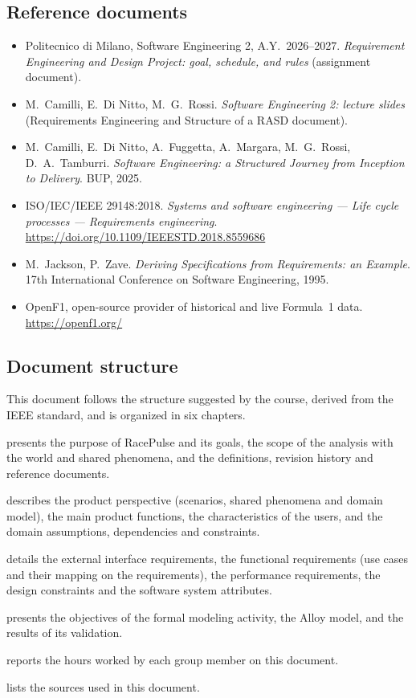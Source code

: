 \documentclass[11pt,a4paper]{article}
\newcommand{\RP}{RacePulse}
\begin{document}
\subsection{Reference documents}
\begin{itemize}[leftmargin=*,itemsep=3pt]
\item Politecnico di Milano, Software Engineering 2, A.Y.\ 2026--2027. \emph{Requirement Engineering and Design Project: goal, schedule, and rules} (assignment document).
\item M.\ Camilli, E.\ Di Nitto, M.\ G.\ Rossi. \emph{Software Engineering 2: lecture slides} (Requirements Engineering and Structure of a RASD document).
\item M.\ Camilli, E.\ Di Nitto, A.\ Fuggetta, A.\ Margara, M.\ G.\ Rossi, D.\ A.\ Tamburri. \emph{Software Engineering: a Structured Journey from Inception to Delivery}. BUP, 2025.
\item ISO/IEC/IEEE 29148:2018. \emph{Systems and software engineering --- Life cycle processes --- Requirements engineering}. \url{https://doi.org/10.1109/IEEESTD.2018.8559686}
\item M.\ Jackson, P.\ Zave. \emph{Deriving Specifications from Requirements: an Example}. 17th International Conference on Software Engineering, 1995.
\item OpenF1, open-source provider of historical and live Formula~1 data. \url{https://openf1.org/}
\end{itemize}
 
\subsection{Document structure}
This document follows the structure suggested by the course, derived from the IEEE standard, and is organized in six chapters.
\begin{description}[leftmargin=!,labelwidth=3.4cm,itemsep=4pt]
\item[Chapter 1: Introduction] presents the purpose of \RP{} and its goals, the scope of the analysis with the world and shared phenomena, and the definitions, revision history and reference documents.
\item[Chapter 2: Overall description] describes the product perspective (scenarios, shared phenomena and domain model), the main product functions, the characteristics of the users, and the domain assumptions, dependencies and constraints.
\item[Chapter 3: Specific requirements] details the external interface requirements, the functional requirements (use cases and their mapping on the requirements), the performance requirements, the design constraints and the software system attributes.
\item[Chapter 4: Formal analysis using Alloy] presents the objectives of the formal modeling activity, the Alloy model, and the results of its validation.
\item[Chapter 5: Effort spent] reports the hours worked by each group member on this document.
\item[Chapter 6: References] lists the sources used in this document.
\end{description}
\end{document}
